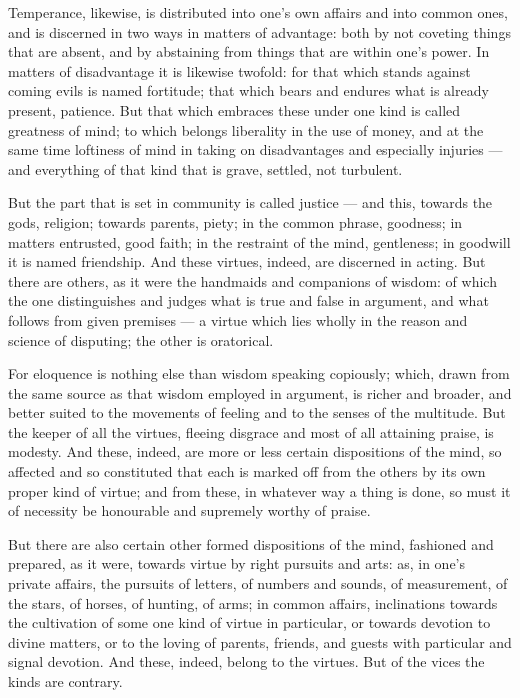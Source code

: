  Temperance, likewise, is distributed into one's own affairs and into common ones, and is discerned in two ways in matters of advantage: both by not coveting things that are absent, and by abstaining from things that are within one's power. In matters of disadvantage it is likewise twofold: for that which stands against coming evils is named fortitude; that which bears and endures what is already present, patience. But that which embraces these under one kind is called greatness of mind; to which belongs liberality in the use of money, and at the same time loftiness of mind in taking on disadvantages and especially injuries — and everything of that kind that is grave, settled, not turbulent.

 But the part that is set in community is called justice — and this, towards the gods, religion; towards parents, piety; in the common phrase, goodness; in matters entrusted, good faith; in the restraint of the mind, gentleness; in goodwill it is named friendship. And these virtues, indeed, are discerned in acting. But there are others, as it were the handmaids and companions of wisdom: of which the one distinguishes and judges what is true and false in argument, and what follows from given premises — a virtue which lies wholly in the reason and science of disputing; the other is oratorical.

 For eloquence is nothing else than wisdom speaking copiously; which, drawn from the same source as that wisdom employed in argument, is richer and broader, and better suited to the movements of feeling and to the senses of the multitude. But the keeper of all the virtues, fleeing disgrace and most of all attaining praise, is modesty. And these, indeed, are more or less certain dispositions of the mind, so affected and so constituted that each is marked off from the others by its own proper kind of virtue; and from these, in whatever way a thing is done, so must it of necessity be honourable and supremely worthy of praise.

 But there are also certain other formed dispositions of the mind, fashioned and prepared, as it were, towards virtue by right pursuits and arts: as, in one's private affairs, the pursuits of letters, of numbers and sounds, of measurement, of the stars, of horses, of hunting, of arms; in common affairs, inclinations towards the cultivation of some one kind of virtue in particular, or towards devotion to divine matters, or to the loving of parents, friends, and guests with particular and signal devotion. And these, indeed, belong to the virtues. But of the vices the kinds are contrary.

